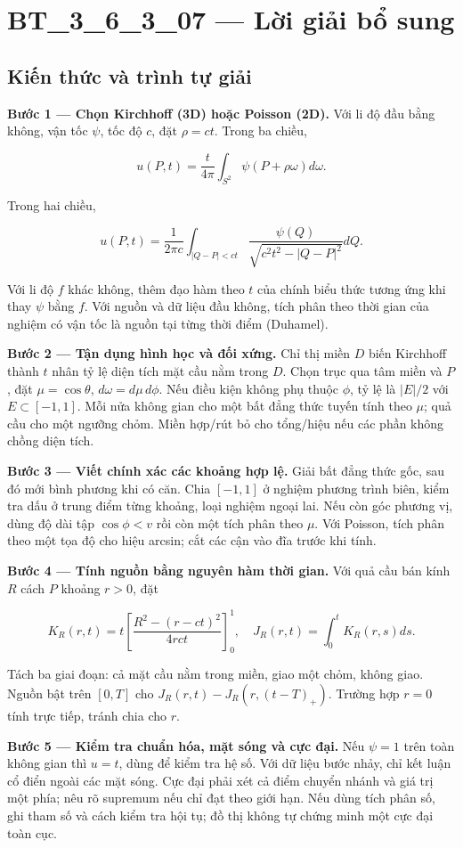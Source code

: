 \documentclass[10pt,a4paper]{article}
\begin{document}
\section*{BT\_3\_6\_3\_07 — Lời giải bổ sung}
\subsection*{Kiến thức và trình tự giải}
\textbf{Bước 1 — Chọn Kirchhoff (3D) hoặc Poisson (2D).} Với li độ đầu bằng không, vận tốc $\psi$, tốc độ $c$, đặt $\rho=ct$. Trong ba chiều,


\[
u(P,t)=\frac t{4\pi}\int_{S^2}\psi(P+\rho\omega)d\omega.
\]


Trong hai chiều,


\[
u(P,t)=\frac1{2\pi c}\int_{|Q-P|<ct}\frac{\psi(Q)}{\sqrt{c^2t^2-|Q-P|^2}}dQ.
\]


Với li độ $f$ khác không, thêm đạo hàm theo $t$ của chính biểu thức tương ứng khi thay $\psi$ bằng $f$. Với nguồn và dữ liệu đầu không, tích phân theo thời gian của nghiệm có vận tốc là nguồn tại từng thời điểm (Duhamel).

\textbf{Bước 2 — Tận dụng hình học và đối xứng.} Chỉ thị miền $D$ biến Kirchhoff thành $t$ nhân tỷ lệ diện tích mặt cầu nằm trong $D$. Chọn trục qua tâm miền và $P$, đặt $\mu=\cos\theta$, $d\omega=d\mu\,d\phi$. Nếu điều kiện không phụ thuộc $\phi$, tỷ lệ là $|E|/2$ với $E\subset[-1,1]$. Mỗi nửa không gian cho một bất đẳng thức tuyến tính theo $\mu$; quả cầu cho một ngưỡng chỏm. Miền hợp/rút bỏ cho tổng/hiệu nếu các phần không chồng diện tích.

\textbf{Bước 3 — Viết chính xác các khoảng hợp lệ.} Giải bất đẳng thức gốc, sau đó mới bình phương khi có căn. Chia $[-1,1]$ ở nghiệm phương trình biên, kiểm tra dấu ở trung điểm từng khoảng, loại nghiệm ngoại lai. Nếu còn góc phương vị, dùng độ dài tập $\cos\phi<v$ rồi còn một tích phân theo $\mu$. Với Poisson, tích phân theo một tọa độ cho hiệu arcsin; cắt các cận vào đĩa trước khi tính.

\textbf{Bước 4 — Tính nguồn bằng nguyên hàm thời gian.} Với quả cầu bán kính $R$ cách $P$ khoảng $r>0$, đặt


\[
K_R(r,t)=t\left[\frac{R^2-(r-ct)^2}{4rct}\right]_0^1,\quad J_R(r,t)=\int_0^tK_R(r,s)ds.
\]


Tách ba giai đoạn: cả mặt cầu nằm trong miền, giao một chỏm, không giao. Nguồn bật trên $[0,T]$ cho $J_R(r,t)-J_R(r,(t-T)_+)$. Trường hợp $r=0$ tính trực tiếp, tránh chia cho $r$.

\textbf{Bước 5 — Kiểm tra chuẩn hóa, mặt sóng và cực đại.} Nếu $\psi=1$ trên toàn không gian thì $u=t$, dùng để kiểm tra hệ số. Với dữ liệu bước nhảy, chỉ kết luận cổ điển ngoài các mặt sóng. Cực đại phải xét cả điểm chuyển nhánh và giá trị một phía; nêu rõ supremum nếu chỉ đạt theo giới hạn. Nếu dùng tích phân số, ghi tham số và cách kiểm tra hội tụ; đồ thị không tự chứng minh một cực đại toàn cục.
\end{document}
